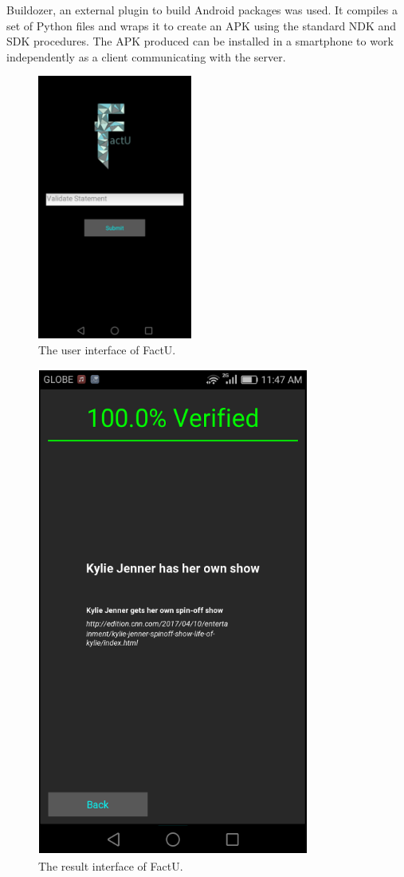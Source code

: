 \documentclass[journal]{./IEEEtran}
\begin{document}
	Buildozer, an external plugin to build Android packages was used. It compiles a set of Python files and wraps it to create an APK using the standard NDK and SDK procedures. The APK produced can be installed in a smartphone to work independently as a client communicating with the server.
	
	\begin{figure}
		\begin{center}
		\includegraphics[width=2in]{appui}
		\end{center}
		\label{appui}
		\caption{The user interface of FactU.}
	\end{figure}
	\begin{figure}
		\begin{center}
		\includegraphics[width=2 in]{Capture}
		\end{center}
		\label{appui}
		\caption{The result interface of FactU.}
	\end{figure}
\end{document}
